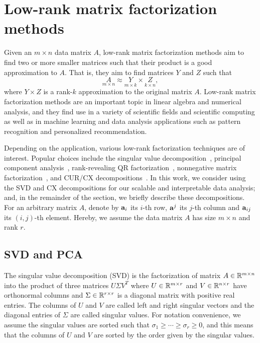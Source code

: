 \section{Low-rank matrix factorization methods}
\label{sxn:low-rank-methods}

Given an $m \times n$ data matrix $A$, low-rank matrix factorization methods aim to find two or more smaller matrices such that their product is a good approximation to $A$.
That is, they aim to find matrices $Y$ and $Z$ such that
\begin{equation}
 \label{eqn:apprx}
    \underset{m\times n}{A} \approx \underset{m\times k}{Y} \times \underset{k\times n}{Z} , 
\end{equation}
where $Y \times Z$ is a rank-$k$ approximation to the original matrix $A$.
Low-rank matrix factorization methods are an important topic in linear algebra and numerical analysis, and they find use in a variety of scientific fields and scientific computing as well as in machine learning and data analysis applications such as pattern recognition and personalized recommendation.

Depending on the application, various low-rank factorization techniques are of interest. 
Popular choices include the singular value decomposition~\cite{GVL96}, principal component analysis~\cite{pcaBook}, rank-revealing QR factorization~\cite{GE96}, nonnegative matrix factorization~\cite{NMFalg}, and CUR/CX decompositions~\cite{CUR_PNAS}.
In this work, we consider using the SVD and CX decompositions for our scalable and interpretable data analysis; and, in the remainder of the section, we briefly describe these decompositions.
For an arbitrary matrix $A$, denote by $\mathbf{a}_i$ its $i$-th row, $\mathbf{a}^j$ its $j$-th column and $\mathbf{a}_{ij}$ its $(i,j)$-th element. 
Hereby, we assume the data matrix $A$ has size $m \times n$ and rank $r$.


\subsection{SVD and PCA}

The singular value decomposition (SVD) is the factorization of matrix $A \in \mathbb{R}^{m\times n}$ into the product of three matrices $U\Sigma V^T$ where $U \in \mathbb{R}^{m\times r}$ and $V\in \mathbb{R}^{n\times r}$ have orthonormal columns and $\Sigma\in \mathbb{R}^{r\times r}$ is a diagonal matrix with positive real entries. 
The columns of $U$ and $V$ are called left and right singular vectors and the diagonal entries of $\Sigma$ are called singular values. 
For notation convenience, we assume the singular values are sorted such that $\sigma_1\geq \cdots \geq \sigma_r\geq 0$, and this means that the columns of $U$ and $V$ are sorted by the order given by the singular values.  

